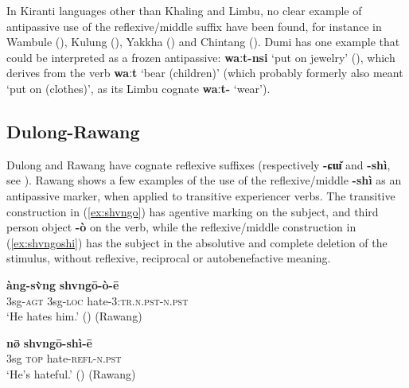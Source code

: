 \documentclass[oneside,a4paper,11pt]{article}
\newcommand{\ipa}[1]{{\phon\textbf{#1}}}
\begin{document}
In  Kiranti languages other than Khaling and Limbu, no clear example of antipassive use of the reflexive/middle suffix have been found, for instance in Wambule (\citealt[305-6]{opgenort04wambule}), Kulung (\citealt[61-2]{tolsma06kulung}), Yakkha (\citealt[307-9]{schackow15yakkha}) and Chintang (\citealt{schikowski15flexible}). Dumi has one example that could be interpreted as a frozen antipassive:  \ipa{waːt-nsi} `put on jewelry' (\citealt[125-9]{driem93dumi}), which derives from the verb \ipa{waːt} `bear (children)' (which probably formerly also meant `put on (clothes)', as its Limbu cognate \ipa{waːt-} `wear').

\subsection{Dulong-Rawang} \label{sec:rawang}
Dulong and Rawang have cognate reflexive suffixes (respectively \ipa{-ɕɯ̌} and \ipa{-shì}, see \citealt{lapolla04reflexive}). Rawang shows a few examples of the use of the reflexive/middle \ipa{-shì} as an antipassive marker, when applied to transitive experiencer verbs. The transitive construction in (\ref{ex:shvngo}) has agentive marking on the subject, and third person object \ipa{-ò} on the verb, while the reflexive/middle construction in (\ref{ex:shvngoshi}) has the subject in the absolutive and complete deletion of the stimulus, without reflexive, reciprocal or autobenefactive meaning.

\begin{exe}
\ex  \label{ex:shvngo}
\gll \ipa{à:ng-i} \ipa{àng-sv̀ng} \ipa{shvngō-ò-ē} \\
3sg-\textsc{agt} 3sg-\textsc{loc} hate-\textsc{3:tr.n.pst-n.pst} \\
\glt `He hates him.' (\citealt[294]{lapolla01valency}) (Rawang)
\end{exe}

\begin{exe}
\ex  \label{ex:shvngoshi}
\gll  \ipa{àng} \ipa{nø̄} \ipa{shvngō-shì-ē} \\
3sg \textsc{top} hate-\textsc{refl-n.pst} \\
\glt `He's hateful.' (\citealt[294]{lapolla01valency}) (Rawang)
 \end{exe}
 
\end{document}
